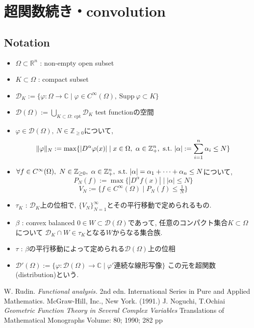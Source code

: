 \chapter{超関数続き・convolution}

\section*{Notation}
\begin{itemize}
    \item \(\Omega \subset \mathbb{R}^n\) : non-empty open subset
    \item \(K \subset \Omega\) : compact subset %
    \item \(\mathcal{D}_K := \{\varphi : \Omega \to \mathbb{C} \mid \varphi \in C^\infty(\Omega), \ \mathrm{Supp} \ \varphi \subset K\}\)
    \item \(\mathcal{D}(\Omega) := \bigcup_{K \subset \Omega: \ \mathrm{cpt}} \mathcal{D}_K\) test functionの空間
    \item \(\varphi \in \mathcal{D}(\Omega), \ N \in \mathbb{Z}_{\ge 0}\)について, 
    \[
    \|\varphi\|_N := \max \{ |D^\alpha \varphi(x)| \mid x \in \Omega, \ \alpha \in \N^n, \ \text{s.t.} \ |\alpha| := \sum_{i=1}^n \alpha_i \le N \}
    \]
    \item \(\forall f \in C^\infty(\Omega), \ N \in \mathbb{Z}_{\ge 0}, \ \alpha \in \mathbb{Z}_+^n, \ \text{s.t.} \ |\alpha| = \alpha_1 + \dots + \alpha_n \le N\)について, 
    \[
    P_N(f) := \max \{ |D^\alpha f(x)| \mid |\alpha| \le N \}
    \]
    \[
    V_N := \{ f \in C^\infty(\Omega) \mid P_N(f) \le \tfrac{1}{N} \}
    \]
    \item \(\tau_K\) : \(\mathcal{D}_K\)上の位相で, \(\{V_N\}_{N=1}^\infty\)とその平行移動で定められるもの. 
    \item \(\beta\) : convex  balanced \(0 \in W \subset \mathcal{D}(\Omega)\)であって, 任意のコンパクト集合$K \subset \Omega$について
    \(\mathcal{D}_K \cap W \in \tau_K\)となる$W$からなる集合族. 
        \item \(\tau\) : \(\beta\)の平行移動によって定められる\(\mathcal{D}(\Omega)\)上の位相
    \item \(\mathcal{D}'(\Omega) := \{ \varphi : \mathcal{D}(\Omega) \to \mathbb{C} \mid \varphi' \text{連続な線形写像} \}\) この元を超関数(distribution)という. 
\end{itemize}

\begin{thebibliography}{n}
W. Rudin. \textit{Functional analysis.} 2nd edn. International Series in Pure and Applied Mathematics. McGraw-Hill, Inc., New York. (1991.)
J. Noguchi, T.Ochiai \textit{Geometric Function Theory in Several Complex Variables} Translations of Mathematical Monographs
Volume: 80; 1990; 282 pp
\end{thebibliography}
 

